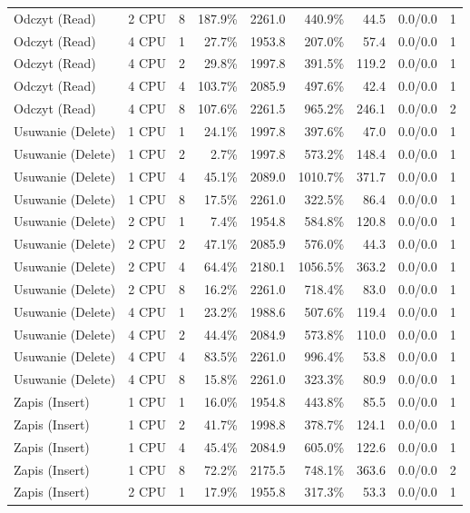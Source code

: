 \begin{table}[ht]
{\begin{tabular}{llcrrrrcc}
Odczyt (Read) & 2 CPU & 8 & 187.9\% & 2261.0 & 440.9\% & 44.5 & 0.0/0.0 & 1 \\
Odczyt (Read) & 4 CPU & 1 & 27.7\% & 1953.8 & 207.0\% & 57.4 & 0.0/0.0 & 1 \\
Odczyt (Read) & 4 CPU & 2 & 29.8\% & 1997.8 & 391.5\% & 119.2 & 0.0/0.0 & 1 \\
Odczyt (Read) & 4 CPU & 4 & 103.7\% & 2085.9 & 497.6\% & 42.4 & 0.0/0.0 & 1 \\
Odczyt (Read) & 4 CPU & 8 & 107.6\% & 2261.5 & 965.2\% & 246.1 & 0.0/0.0 & 2 \\
Usuwanie (Delete) & 1 CPU & 1 & 24.1\% & 1997.8 & 397.6\% & 47.0 & 0.0/0.0 & 1 \\
Usuwanie (Delete) & 1 CPU & 2 & 2.7\% & 1997.8 & 573.2\% & 148.4 & 0.0/0.0 & 1 \\
Usuwanie (Delete) & 1 CPU & 4 & 45.1\% & 2089.0 & 1010.7\% & 371.7 & 0.0/0.0 & 1 \\
Usuwanie (Delete) & 1 CPU & 8 & 17.5\% & 2261.0 & 322.5\% & 86.4 & 0.0/0.0 & 1 \\
Usuwanie (Delete) & 2 CPU & 1 & 7.4\% & 1954.8 & 584.8\% & 120.8 & 0.0/0.0 & 1 \\
Usuwanie (Delete) & 2 CPU & 2 & 47.1\% & 2085.9 & 576.0\% & 44.3 & 0.0/0.0 & 1 \\
Usuwanie (Delete) & 2 CPU & 4 & 64.4\% & 2180.1 & 1056.5\% & 363.2 & 0.0/0.0 & 1 \\
Usuwanie (Delete) & 2 CPU & 8 & 16.2\% & 2261.0 & 718.4\% & 83.0 & 0.0/0.0 & 1 \\
Usuwanie (Delete) & 4 CPU & 1 & 23.2\% & 1988.6 & 507.6\% & 119.4 & 0.0/0.0 & 1 \\
Usuwanie (Delete) & 4 CPU & 2 & 44.4\% & 2084.9 & 573.8\% & 110.0 & 0.0/0.0 & 1 \\
Usuwanie (Delete) & 4 CPU & 4 & 83.5\% & 2261.0 & 996.4\% & 53.8 & 0.0/0.0 & 1 \\
Usuwanie (Delete) & 4 CPU & 8 & 15.8\% & 2261.0 & 323.3\% & 80.9 & 0.0/0.0 & 1 \\
Zapis (Insert) & 1 CPU & 1 & 16.0\% & 1954.8 & 443.8\% & 85.5 & 0.0/0.0 & 1 \\
Zapis (Insert) & 1 CPU & 2 & 41.7\% & 1998.8 & 378.7\% & 124.1 & 0.0/0.0 & 1 \\
Zapis (Insert) & 1 CPU & 4 & 45.4\% & 2084.9 & 605.0\% & 122.6 & 0.0/0.0 & 1 \\
Zapis (Insert) & 1 CPU & 8 & 72.2\% & 2175.5 & 748.1\% & 363.6 & 0.0/0.0 & 2 \\
Zapis (Insert) & 2 CPU & 1 & 17.9\% & 1955.8 & 317.3\% & 53.3 & 0.0/0.0 & 1 \\

\end{tabular}}
\end{table}
